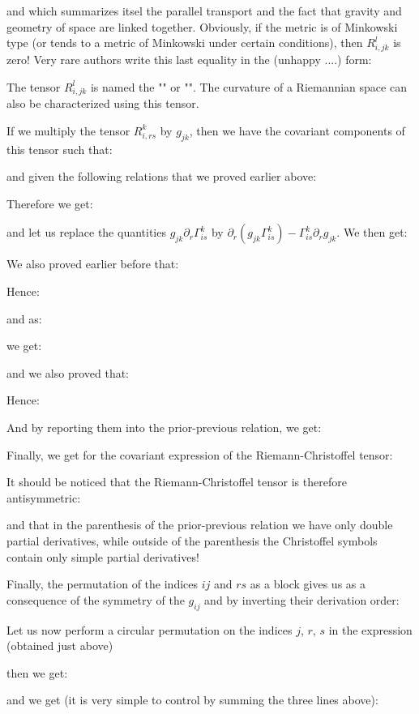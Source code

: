 	and which summarizes itsel the parallel transport and the fact that gravity and geometry of space are linked together. Obviously, if the metric is of Minkowski type (or tends to a metric of Minkowski under certain conditions), then $R_{i,jk}^l$ is zero! Very rare authors write this last equality in the (unhappy ....) form:
	
	The tensor $R_{i,jk}^l$ is named the "" or "". The curvature of a Riemannian space can also be characterized using this tensor.

	If we multiply the tensor $R_{i,rs}^k$ by $g_{jk}$, then we have the covariant components of this tensor such that:
	
	and given the following relations that we proved earlier above:
	
	Therefore we get:
	
	and let us replace the quantities $g_{jk}\partial_r\Gamma_{is}^k$ by $\partial_r\left(g_{jk}\Gamma_{is}^k\right)-\Gamma_{is}^k\partial_r g_{jk}$. We then get:
	
	We also proved earlier before that:
	
	Hence:
	
	and as:
	
	we get:
	
	and we also proved that:
	
	Hence:
	
	And by reporting them into the prior-previous relation, we get:
	
	Finally, we get for the covariant expression of the Riemann-Christoffel tensor:
	
	It should be noticed that the Riemann-Christoffel tensor is therefore antisymmetric:
	
	and that in the parenthesis of the prior-previous relation we have only double partial derivatives, while outside of the parenthesis the Christoffel symbols contain only simple partial derivatives!

	Finally, the permutation of the indices $ij$ and $rs$ as a block gives us as a consequence of the symmetry of the $g_{ij}$ and by inverting their derivation order:
	
	Let us now perform a circular permutation on the indices $j$, $r$, $s$ in the expression (obtained just above)
	
	then we get:
	
	and we get (it is very simple to control by summing the three lines above):
	
